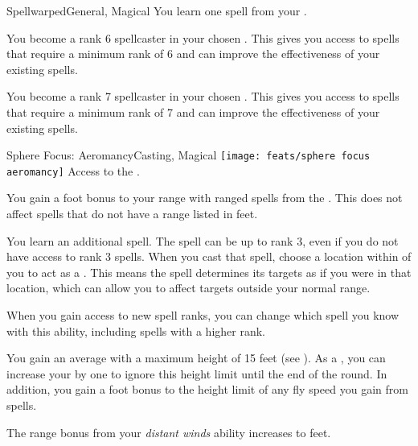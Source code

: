 \begin{magicalfeat}{Spellwarped}{General, Magical}
     You learn one spell from your .

     You become a rank 6 spellcaster in your chosen .
    This gives you access to spells that require a minimum rank of 6 and can improve the effectiveness of your existing spells.

     You become a rank 7 spellcaster in your chosen .
    This gives you access to spells that require a minimum rank of 7 and can improve the effectiveness of your existing spells.
  \end{magicalfeat}

  \begin{magicalfeat}{Sphere Focus: Aeromancy}{Casting, Magical}
    \texttt{[image: feats/sphere focus aeromancy]}
    \featpre Access to the  .

     You gain a  foot bonus to your range with ranged spells from the  .
    This does not affect spells that do not have a range listed in feet.

     You learn an additional spell.
    The spell can be up to rank 3, even if you do not have access to rank 3 spells.
    When you cast that spell, choose a location within \shortrange of you to act as a .
    This means the spell determines its targets as if you were in that location, which can allow you to affect targets outside your normal range.

    When you gain access to new spell ranks, you can change which spell you know with this ability, including spells with a higher rank.

     You gain an average  with a maximum height of 15 feet (see ).
    As a , you can increase your  by one to ignore this height limit until the end of the round.
    In addition, you gain a  foot bonus to the height limit of any fly speed you gain from  spells.

     The range bonus from your \textit{distant winds} ability increases to  feet.
  \end{magicalfeat}

